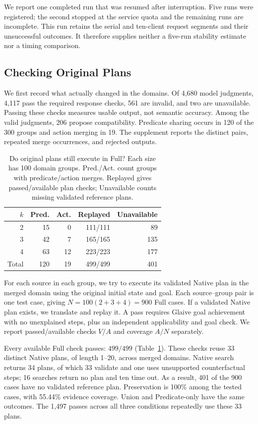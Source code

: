 We report one completed run that was resumed after interruption. Five runs were registered; the second stopped at the service quota and the remaining runs are incomplete. This run retains the serial and ten-client request segments and their unsuccessful outcomes. It therefore supplies neither a five-run stability estimate nor a timing comparison.

\subsection{Checking Original Plans}
We first record what actually changed in the domains. Of 4,680 model judgments, 4,117 pass the required response checks, 561 are invalid, and two are unavailable. Passing these checks measures usable output, not semantic accuracy. Among the valid judgments, 206 propose compatibility. Predicate sharing occurs in 120 of the 300 groups and action merging in 19. The supplement reports the distinct pairs, repeated merge occurrences, and rejected outputs.

\begin{table}[t]
\centering
\caption{Do original plans still execute in Full? Each size has 100 domain groups. Pred./Act. count groups with predicate/action merges. Replayed gives passed/available plan checks; Unavailable counts missing validated reference plans.}
\label{tab:revised-preservation}
\begin{tabular}{rrrrr}
\toprule
$k$ & Pred. & Act. & Replayed & Unavailable\\
\midrule
2 & 15 & 0 & 111/111 & 89\\
3 & 42 & 7 & 165/165 & 135\\
4 & 63 & 12 & 223/223 & 177\\
Total & 120 & 19 & 499/499 & 401\\
\bottomrule
\end{tabular}
\end{table}

For each source in each group, we try to execute its validated Native plan in the merged domain using the original initial state and goal. Each source--group pair is one test case, giving $N=100(2+3+4)=900$ Full cases. If a validated Native plan exists, we translate and replay it. A pass requires Glaive goal achievement with no unexplained steps, plus an independent applicability and goal check. We report passed/available checks $V/A$ and coverage $A/N$ separately.

Every available Full check passes: $499/499$ (Table~\ref{tab:revised-preservation}). These checks reuse 33 distinct Native plans, of length 1--20, across merged domains. Native search returns 34 plans, of which 33 validate and one uses unsupported counterfactual steps; 16 searches return no plan and ten time out. As a result, 401 of the 900 cases have no validated reference plan. Preservation is 100\% among the tested cases, with 55.44\% evidence coverage. Union and Predicate-only have the same outcomes. The 1,497 passes across all three conditions repeatedly use these 33 plans.

